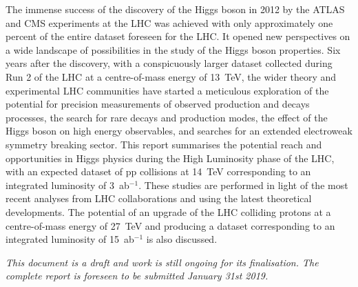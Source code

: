 \documentclass[11pt,twoside,a4paper]{cernrep}
\begin{document}
\begin{titlepage}
The immense success of the discovery of the Higgs boson in 2012 by the
ATLAS and CMS experiments at the LHC was achieved with only
approximately one percent of the entire dataset foreseen for the
LHC. It opened new perspectives on a wide landscape of possibilities
in the study of the Higgs boson properties. Six years after the
discovery, with a conspicuously larger dataset collected during Run 2
of the LHC at a centre-of-mass energy of 13~TeV, the wider theory and experimental LHC communities have
started a meticulous exploration of
the potential for precision measurements of observed production and
decays processes, the search for rare decays and production modes, the effect of the Higgs
boson on high energy observables, and searches for an extended electroweak symmetry breaking
sector. This report summarises the potential reach and opportunities in Higgs physics during the High 
Luminosity phase of the LHC, with an expected dataset of pp collisions at 14~TeV 
corresponding to an integrated luminosity of 3~ab$^{-1}$. These studies are performed in light of the 
most recent analyses from LHC collaborations and using the latest theoretical developments. 
The potential of an upgrade of the LHC colliding
protons at a centre-of-mass energy of 27~TeV and producing a dataset 
corresponding to an integrated luminosity of 15~ab$^{-1}$ is also 
discussed. 


\vspace*{2.0cm}

\begin{center}
{\it
This document is a draft and work is still ongoing for its finalisation. The complete report is foreseen to be submitted January 31st 2019. }
\end{center}


\vspace*{2.0cm}
\vspace{\fill}

\end{titlepage}

\setcounter{tocdepth}{3}
\tableofcontents
\newpage


\newpage

\newpage

\newpage

\newpage

\newpage

\newpage

\newpage

\newpage

\newpage

\newpage
\end{document}
